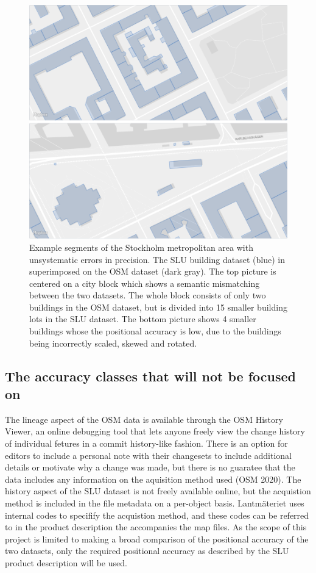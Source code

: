 \documentclass[a4paper]{article}
\begin{document}
\begin{figure}[H]
    \centering
    \includegraphics[width=\textwidth,height=0.5\textheight,keepaspectratio]{img_map_compare}
    \caption{Example segments of the Stockholm metropolitan area with unsystematic errors in precision. The SLU building dataset (blue) in superimposed on the OSM dataset (dark gray). The top picture is centered on a city block which shows a semantic mismatching between the two datasets. The whole block consists of only two buildings in the OSM dataset, but is divided into 15 smaller building lots in the SLU dataset. The bottom picture shows 4 smaller buildings whose the positional accuracy is low, due to the buildings being incorrectly scaled, skewed and rotated.}
    \label{fig:osm-slu-map}
\end{figure}

\subsection{The accuracy classes that will not be focused on}

The lineage aspect of the OSM data is available through the OSM History Viewer, an online debugging tool that lets anyone freely view the change history of individual fetures in a commit history-like fashion. There is an option for editors to include a personal note with their changesets to include additional details or motivate why a change was made, but there is no guaratee that the data includes any information on the aquisition method used (OSM 2020). The history aspect of the SLU dataset is not freely available online, but the acquistion method is included in the file metadata on a per-object basis. Lantmäteriet uses internal codes to specifify the acquistion method, and these codes can be referred to in the product description the accompanies the map files. As the scope of this project is limited to making a broad comparison of the positional accuracy of the two datasets, only the required positional accuracy as described by the SLU product description will be used.
\end{document}
